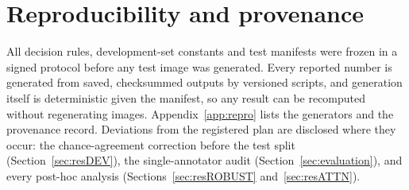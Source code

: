 \section{Reproducibility and provenance}\label{sec:repro}
All decision rules, development-set constants and test manifests were frozen in a signed protocol before any test image was generated. Every reported number is generated from saved, checksummed outputs by versioned scripts, and generation itself is deterministic given the manifest, so any result can be recomputed without regenerating images. Appendix~\ref{app:repro} lists the generators and the provenance record. Deviations from the registered plan are disclosed where they occur: the chance-agreement correction before the test split (Section~\ref{sec:resDEV}), the single-annotator audit (Section~\ref{sec:evaluation}), and every post-hoc analysis (Sections~\ref{sec:resROBUST} and~\ref{sec:resATTN}).
